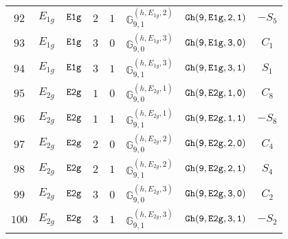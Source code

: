 \documentclass[fleqn,8pt]{jsarticle}
\begin{document}
\begin{table}[ht!]
\begin{center}
\begin{tabular}{cccccccc}
$ 92 $ & $ E_{1g} $ & $ {\tt E1g} $ & $ 2 $ & $ 1 $ & $ \mathbb{G}_{9,1}^{(h,E_{1g},2)} $ & $ {\tt Gh(9,E1g,2,1)} $ & $ - S_{5} $ \\
$ 93 $ & $ E_{1g} $ & $ {\tt E1g} $ & $ 3 $ & $ 0 $ & $ \mathbb{G}_{9,0}^{(h,E_{1g},3)} $ & $ {\tt Gh(9,E1g,3,0)} $ & $ C_{1} $ \\
$ 94 $ & $ E_{1g} $ & $ {\tt E1g} $ & $ 3 $ & $ 1 $ & $ \mathbb{G}_{9,1}^{(h,E_{1g},3)} $ & $ {\tt Gh(9,E1g,3,1)} $ & $ S_{1} $ \\
$ 95 $ & $ E_{2g} $ & $ {\tt E2g} $ & $ 1 $ & $ 0 $ & $ \mathbb{G}_{9,0}^{(h,E_{2g},1)} $ & $ {\tt Gh(9,E2g,1,0)} $ & $ C_{8} $ \\
$ 96 $ & $ E_{2g} $ & $ {\tt E2g} $ & $ 1 $ & $ 1 $ & $ \mathbb{G}_{9,1}^{(h,E_{2g},1)} $ & $ {\tt Gh(9,E2g,1,1)} $ & $ - S_{8} $ \\
$ 97 $ & $ E_{2g} $ & $ {\tt E2g} $ & $ 2 $ & $ 0 $ & $ \mathbb{G}_{9,0}^{(h,E_{2g},2)} $ & $ {\tt Gh(9,E2g,2,0)} $ & $ C_{4} $ \\
$ 98 $ & $ E_{2g} $ & $ {\tt E2g} $ & $ 2 $ & $ 1 $ & $ \mathbb{G}_{9,1}^{(h,E_{2g},2)} $ & $ {\tt Gh(9,E2g,2,1)} $ & $ S_{4} $ \\
$ 99 $ & $ E_{2g} $ & $ {\tt E2g} $ & $ 3 $ & $ 0 $ & $ \mathbb{G}_{9,0}^{(h,E_{2g},3)} $ & $ {\tt Gh(9,E2g,3,0)} $ & $ C_{2} $ \\
$ 100 $ & $ E_{2g} $ & $ {\tt E2g} $ & $ 3 $ & $ 1 $ & $ \mathbb{G}_{9,1}^{(h,E_{2g},3)} $ & $ {\tt Gh(9,E2g,3,1)} $ & $ - S_{2} $ \\
 \hline \hline
\end{tabular}
\end{center}
\end{table}
\end{document}
